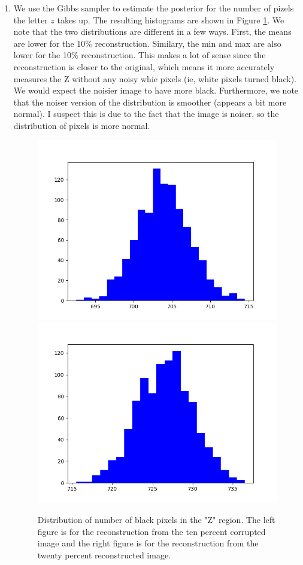 \documentclass[12pt]{article}
\begin{document}
\begin{enumerate}[label=(\alph*)]
\item We use the Gibbs sampler to estimate the posterior for the number of pizels the letter $z$ takes up. The resulting histograms are shown in Figure \ref{fig:frequency_z}. We note that the two distributions are different in a few ways. First, the means are lower for the 10\% reconstruction. Similary, the min and max are also lower for the 10\% reconstruction. This makes a lot of sense since the reconstruction is closer to the original, which means it more accurately measures the Z without any noisy whie pixels (ie, white pixels turned black). We would expect the noisier image to have more black. Furthermore, we note that the noiser version of the distribution is smoother (appears a bit more normal). I suspect this is due to the fact that the image is noiser, so the distribution of pixels is more normal.

\begin{figure}
\centering
\includegraphics[scale=0.5]{programming/f_10.png}
\includegraphics[scale=0.5]{programming/f_20.png}
\caption{Distribution of number of black pixels in the "Z" region. The left figure is for the reconstruction from the ten percent corrupted image and the right figure is for the reconstruction from the twenty percent reconstructed image.}
\label{fig:frequency_z}
\end{figure}


\end{enumerate}
\end{document}
